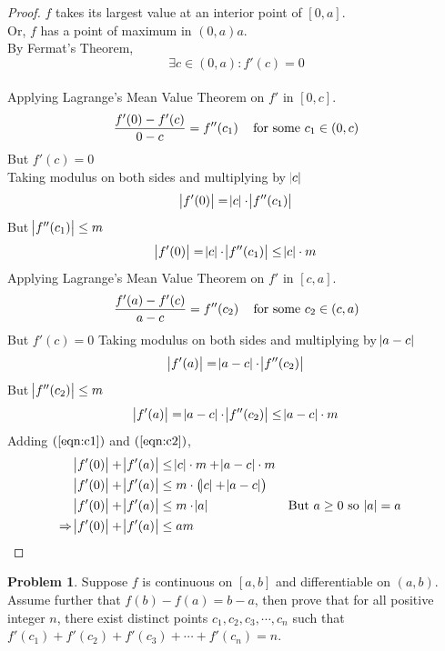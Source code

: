 \documentclass[14]{article}
\theoremstyle{definition}
\newtheorem{prob}{Problem}
\theoremstyle{case}
\begin{document}
\begin{proof}
$f$ takes its largest value at an interior point of $[0, a]$.\\
Or, $f$ has a point of maximum in $(0, a)a$.\\
By Fermat's Theorem, \[\exists c \in (0, a) : f'(c) = 0\]\\
Applying Lagrange's Mean Value Theorem on $f'$ in $[0, c]$.\\
\[\dfrac{f'(0) - f'(c)}{0 - c} = f''(c_1) \text{\;\;\; for some } c_1 \in (0, c)\]
But $f'(c) = 0$\\
Taking modulus on both sides and multiplying by $\abs{c}$
\[\abs{f'(0)} = \abs{c} \cdot \abs{f''(c_1)}\]
But $\abs{f''(c_1)}\leq m$
\begin{equation}\label{eqn:c1}
\abs{f'(0)} = \abs{c} \cdot \abs{f''(c_1)} \leq \abs{c} \cdot m
\end{equation}
Applying Lagrange's Mean Value Theorem on $f'$ in $[c, a]$.\\
\[\dfrac{f'(a) - f'(c)}{a - c} = f''(c_2) \text{\;\;\; for some } c_2 \in (c, a)\]
But $f'(c) = 0$
Taking modulus on both sides and multiplying by $\abs{a - c}$
\[\abs{f'(a)} = \abs{a - c} \cdot \abs{f''(c_2)}\]
But $\abs{f''(c_2)} \leq m$
\begin{equation}\label{eqn:c2}
\abs{f'(a)} = \abs{a - c} \cdot \abs{f''(c_2)} \leq \abs{a - c} \cdot m
\end{equation}
Adding $(\ref{eqn:c1})$ and $(\ref{eqn:c2})$,
\begin{align*}
\abs{f'(0)} + \abs{f'(a)} &\leq \abs{c} \cdot m + \abs{a - c} \cdot m\\
\abs{f'(0)} + \abs{f'(a)} &\leq m \cdot \left(\abs{c} + \abs{a - c}\right)\\
\abs{f'(0)} + \abs{f'(a)} &\leq m \cdot \abs{a} && \text{But } a \geq 0 \text{ so } \abs{a} = a \\
\Rightarrow \abs{f'(0)} + \abs{f'(a)} &\leq a m
\end{align*}
\end{proof}
\pagebreak
\begin{prob}
Suppose $f$ is continuous on $[a, b]$ and differentiable on $(a, b)$. Assume further that $f(b) - f(a) = b - a$, then prove that for all positive integer $n$, there exist distinct points $c_1, c_2, c_3, \cdots, c_n$ such that $f'(c_1) + f'(c_2) + f'(c_3) + \cdots + f'(c_n) = n$.
\end{prob}
\end{document}
